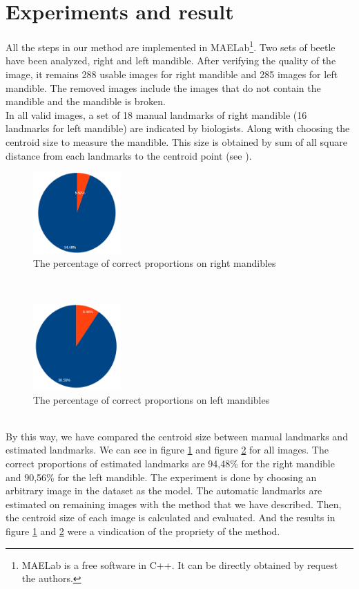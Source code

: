 \documentclass[twoside,twocolumn,10pt]{article}
\begin{document}
\section{Experiments and result}
All the steps in our method are implemented in MAELab\footnote{MAELab
  is a free software in C++. It can be directly obtained by request
  the authors.}. Two sets of beetle have been analyzed, right and left
mandible. After verifying the quality of the image, it remains 288
usable images for right mandible and 285 images for left mandible. The
removed images include the images that do not contain the mandible and
the mandible is broken.\\

In all valid images, a set of 18 manual landmarks of right mandible
(16 landmarks for left mandible) are indicated by biologists. Along
with choosing the centroid size to measure the mandible. This size is
obtained by sum of all square distance from each landmarks to the
centroid point (see \cite{web2010}).

\begin{figure}[htb]
    \centering
    \includegraphics[width=0.3\textwidth]{./images/mdresult}
    \caption{The percentage of correct proportions on right mandibles }
    \label{figmdresult}
\end{figure}~\\
\begin{figure}[htb]
    \centering
    \includegraphics[width=0.3\textwidth]{./images/mgresult}
    \caption{The percentage of correct proportions on left mandibles }
    \label{figmgresult}
\end{figure}~\\
By this way, we have compared the centroid size between manual
landmarks and estimated landmarks. We can see in figure
\ref{figmdresult} and figure \ref{figmgresult} for all images. The
correct proportions of estimated landmarks are 94,48\% for the right
mandible and 90,56\% for the left mandible. The experiment is done by choosing an arbitrary 
image in the dataset as the model. The automatic landmarks are estimated on remaining images with the method that we have described. Then, the centroid size of each image is calculated and evaluated. And the results in figure \ref{figmdresult} and \ref{figmgresult} were a vindication of the propriety of the method.\\
\end{document}
